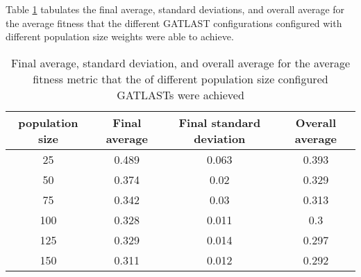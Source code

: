 Table \ref{tab:HP:GA:populationSize:average fitness} tabulates the final average, standard deviations, and overall average for the average fitness that the different GATLAST configurations configured with different population size weights were able to achieve.
\begin{table}[tbh!]
\centering
\begin{adjustbox}{trim=0cm 0cm 0cm 0cm, clip=true}
\begin{tabular}{|c|c|c|c|}
\hline
population size & Final average & Final standard deviation & Overall average\\
\hline
25 & 0.489 & 0.063 & 0.393\\\hline
50 & 0.374 & 0.02 & 0.329\\\hline
75 & 0.342 & 0.03 & 0.313\\\hline
100 & 0.328 & 0.011 & 0.3\\\hline
125 & 0.329 & 0.014 & 0.297\\\hline
150 & 0.311 & 0.012 & 0.292\\\hline
\end{tabular}
\end{adjustbox}
\caption{Final average, standard deviation, and overall average for the average fitness metric that the of different population size configured GATLASTs were achieved}
\label{tab:HP:GA:populationSize:average fitness}
\end{table}